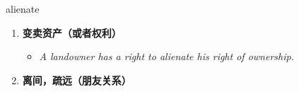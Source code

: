 
\begin{frame}
{\huge alienate}
\begin{center}
\begin{enumerate}\Large
  \item \textbf{变卖资产（或者权利）}
  \begin{itemize}
    \item \em{\Large{A landowner has a right to alienate his right of ownership.}}
  \end{itemize}
  \item \textbf{离间，疏远（朋友关系）}
\end{enumerate}
\end{center}
\end{frame}
